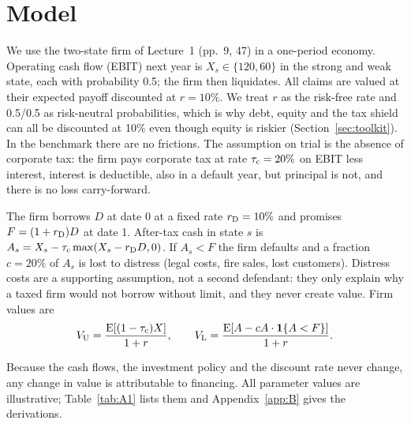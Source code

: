 \section{Model}\label{sec:model}

We use the two-state firm of Lecture~1 (pp.~9, 47) in a one-period economy. Operating cash flow (EBIT) next year is $X_s \in \{120, 60\}$ in the strong and weak state, each with probability 0.5; the firm then liquidates. All claims are valued at their expected payoff discounted at $r = 10\%$. We treat $r$ as the risk-free rate and 0.5/0.5 as risk-neutral probabilities, which is why debt, equity and the tax shield can all be discounted at 10\% even though equity is riskier (Section~\ref{sec:toolkit}). In the benchmark there are no frictions. The assumption on trial is the absence of corporate tax: the firm pays corporate tax at rate $\tau_{\mathrm{c}} = 20\%$ on EBIT less interest, interest is deductible, also in a default year, but principal is not, and there is no loss carry-forward.

The firm borrows $D$ at date 0 at a fixed rate $r_{\mathrm{D}} = 10\%$ and promises $F = (1 + r_{\mathrm{D}})D$ at date 1. After-tax cash in state $s$ is $A_s = X_s - \tau_{\mathrm{c}} \max(X_s - r_{\mathrm{D}} D, 0)$. If $A_s < F$ the firm defaults and a fraction $c = 20\%$ of $A_s$ is lost to distress (legal costs, fire sales, lost customers). Distress costs are a supporting assumption, not a second defendant: they only explain why a taxed firm would not borrow without limit, and they never create value. Firm values are
\begin{equation}
V_{\mathrm{U}} = \frac{\mathrm{E}[(1 - \tau_{\mathrm{c}})X]}{1 + r}, \qquad V_{\mathrm{L}} = \frac{\mathrm{E}[A - cA \cdot \mathbf{1}\{A < F\}]}{1 + r}. \label{eq:values}
\end{equation}

Because the cash flows, the investment policy and the discount rate never change, any change in value is attributable to financing. All parameter values are illustrative; Table~\ref{tab:A1} lists them and Appendix~\ref{app:B} gives the derivations.
